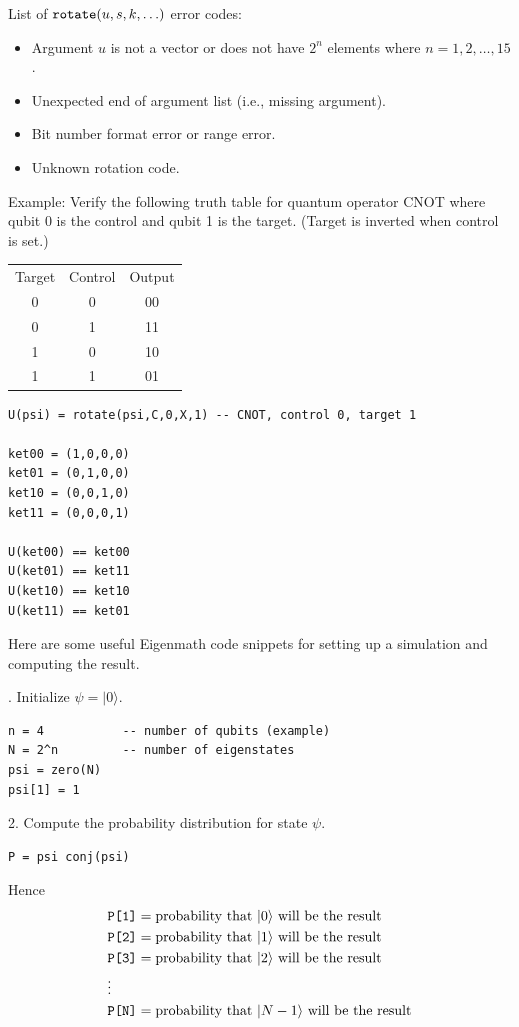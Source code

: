 \bigskip
List of $\text{\tt rotate}(u,s,k,\ldots)$ error codes:
\begin{itemize}
\item[1] Argument $u$ is not a vector or does not have $2^n$ elements where $n=1,2,\ldots,15$.
\item[2] Unexpected end of argument list (i.e., missing argument).
\item[3] Bit number format error or range error.
\item[4] Unknown rotation code.
\end{itemize}

Example:
Verify the following truth table for quantum operator CNOT
where qubit 0 is the control and qubit 1 is the target.
(Target is inverted when control is set.)
\begin{center}
\begin{tabular}{ccc}
Target & Control & Output \\
0 & 0 & 00 \\
0 & 1 & 11 \\
1 & 0 & 10 \\
1 & 1 & 01
\end{tabular}
\end{center}

{\color{blue}
\begin{verbatim}
U(psi) = rotate(psi,C,0,X,1) -- CNOT, control 0, target 1

ket00 = (1,0,0,0)
ket01 = (0,1,0,0)
ket10 = (0,0,1,0)
ket11 = (0,0,0,1)

U(ket00) == ket00
U(ket01) == ket11
U(ket10) == ket10
U(ket11) == ket01
\end{verbatim}
}

Here are some useful Eigenmath code snippets for setting up a simulation
and computing the result.

. Initialize $\psi=|0\rangle$.
{\color{blue}
\begin{verbatim}
n = 4           -- number of qubits (example)
N = 2^n         -- number of eigenstates
psi = zero(N)
psi[1] = 1
\end{verbatim}
}

2. Compute the probability distribution for state $\psi$.
{\color{blue}
\begin{verbatim}
P = psi conj(psi)
\end{verbatim}
}

Hence
\begin{align*}
&\text{\tt P[1]}=\text{probability that $|0\rangle$ will be the result}
\\
&\text{\tt P[2]}=\text{probability that $|1\rangle$ will be the result}
\\
&\text{\tt P[3]}=\text{probability that $|2\rangle$ will be the result}
\\
&\vdots
\\
&\text{\tt P[N]}=\text{probability that $|N-1\rangle$ will be the result}
\end{align*}

